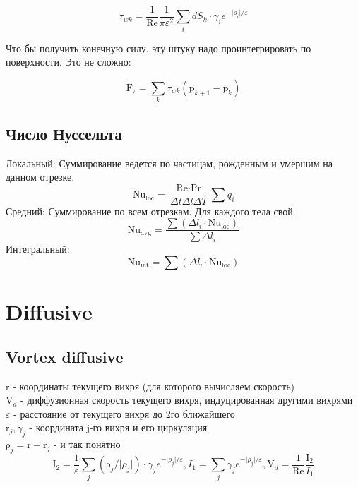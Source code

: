 \documentclass[11pt]{article}
\newcommand{\br}[1]{\boldsymbol{\mathrm{#1}}}
\newcommand{\Reyn}{\text{Re}}
\newcommand{\Pran}{\text{Pr}}
\newcommand{\Nuss}{\text{Nu}}
\begin{document}
$$ \tau_{wk} = \dfrac{1}{\Reyn}\dfrac{1}{\pi\varepsilon^2} \sum\limits_i dS_k\cdot \gamma_i e^{-\lvert\rho_i\rvert/\varepsilon}$$

Что бы получить конечную силу, эту штуку надо проинтегрировать по поверхности. Это не сложно:

$$ \br F_\tau = \sum_k {\tau_{wk} (\br p_{k+1} - \br p_k) } $$

\subsection{Число Нуссельта}

Локальный: Суммирование ведется по частицам, рожденным и умершим на данном отрезке.
$$\Nuss_\text{loc} = \dfrac{\Reyn \cdot \Pran}{\Delta t \Delta l \Delta T} \sum q_i$$
Средний: Суммирование по всем отрезкам. Для каждого тела свой.
$$\Nuss_\text{avg} = \dfrac{\sum (\Delta l_i \cdot \Nuss_\text{loc})}{\sum \Delta l_i}$$
Интегральный:
$$\Nuss_\text{int} = \sum ( \Delta l_i \cdot \Nuss_\text{loc})$$


\newpage
\section{Diffusive}
\subsection{Vortex diffusive}

$\br r$ - координаты текущего вихря (для которого вычисляем скорость) \\
$\br V_d$ - диффузионная скорость текущего вихря, индуцированная другими вихрями \\
$\varepsilon$ - расстояние от текущего вихря до 2го ближайшего \\
$\br r_j, \gamma_j$ - координата j-го вихря и его циркуляция \\
$\br\rho_j = \br r - \br r_j$ - и так понятно \\

\begin{equation*}
\br I_2 = \dfrac{1}{\varepsilon}
\sum\limits_j (\br\rho_j / \lvert\rho_j\rvert)\cdot\gamma_j e^{-\lvert\rho_j\rvert/\varepsilon},
I_1 = {\sum\limits_j \gamma_j e^{-\lvert\rho_j\rvert/\varepsilon}},
\br V_d = \dfrac{1}{\Reyn} \dfrac{\br I_2}{I_1}
\end{equation*}
\end{document}
